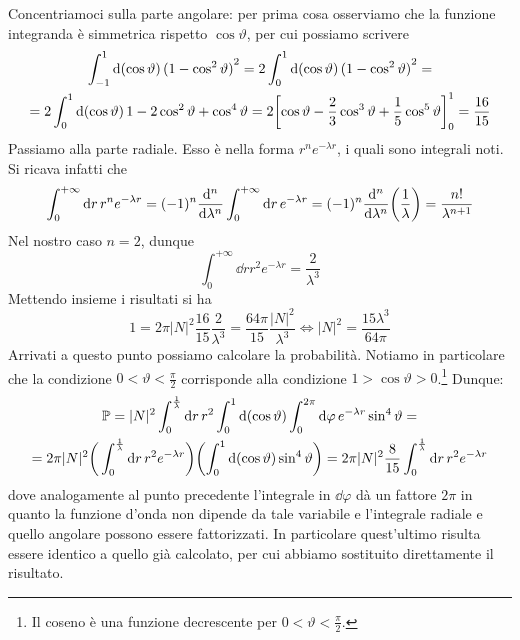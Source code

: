 \begin{soluzione}
   Concentriamoci sulla parte angolare: per prima cosa osserviamo che la funzione integranda è simmetrica rispetto $\cos{\vartheta}$, per cui possiamo scrivere
   \begin{gather*}
      \int_{-1}^{1} \dd{(\cos{\vartheta})} {(1 - \cos^2{\vartheta} )}^2
      =2 \int_{0}^{1} \dd{(\cos{\vartheta})} {(1 - \cos^2{\vartheta} )}^2=
      \\
      =2 \int_{0}^{1} \dd{(\cos{\vartheta})} 1 - 2\cos^2{\vartheta} + \cos^4{\vartheta}
      =2 \qty[ \cos{\vartheta} - \frac{2}{3}\cos^3{\vartheta} + \frac{1}{5}\cos^5{\vartheta} ]_{0}^{1}
      =\frac{16}{15}
   \end{gather*}
   Passiamo alla parte radiale. Esso è nella forma $r^n e^{-\lambda r}$, i quali sono integrali noti. Si ricava infatti che
   \begin{equation*}
      \int_{0}^{+\infty}\dd{r} r^n e^{-\lambda r}
      =(-1)^n \dv[n]{\lambda} \int_{0}^{+\infty}\dd{r} e^{-\lambda r}
      =(-1)^n\dv[n]{\lambda} \qty( \frac{1}{\lambda} )
      =\frac{n!}{\lambda^{n+1}}
   \end{equation*}
   Nel nostro caso $n=2$, dunque
   \begin{equation*}
      \int_{0}^{+\infty}\dd{r} r^2 e^{-\lambda r}
      =\frac{2}{\lambda^{3}}
   \end{equation*}
   Mettendo insieme i risultati si ha
   \begin{equation*}
      1=2\pi |N|^2 \frac{16}{15} \frac{2}{\lambda^{3}}
      =\frac{64 \pi}{15} \frac{|N|^2}{\lambda^3}
      \iff
      |N|^2=\frac{15\lambda^3}{64 \pi}
   \end{equation*}
   Arrivati a questo punto possiamo calcolare la probabilità. Notiamo in particolare che la condizione $0 < \vartheta < \frac{\pi}{2}$ corrisponde alla condizione $1 > \cos{\vartheta} > 0$.\footnote{Il coseno è una funzione decrescente per $0 < \vartheta < \frac{\pi}{2}$.} Dunque:
   \begin{gather*}
      \mathbb{P}
      =|N|^2 \int_{0}^{\frac{1}{\lambda}} \dd{r} r^2 \int_{0}^{1} \dd{(\cos{\vartheta})} \int_{0}^{2\pi} \dd{\varphi} e^{-\lambda r} \sin^4{\vartheta}=
      \\
      =2\pi |N|^2 \bigg( \int_{0}^{\frac{1}{\lambda}} \dd{r} r^2 e^{-\lambda r} \bigg) \qty( \int_{0}^{1} \dd{(\cos{\vartheta})} \sin^4{\vartheta} )
      =2\pi |N|^2 \frac{8}{15} \int_{0}^{\frac{1}{\lambda}} \dd{r} r^2 e^{-\lambda r}
   \end{gather*}
   dove analogamente al punto precedente l'integrale in $\dd{\varphi}$ dà un fattore $2\pi$ in quanto la funzione d'onda non dipende da tale variabile e l'integrale radiale e quello angolare possono essere fattorizzati. In particolare quest'ultimo risulta essere identico a quello già calcolato, per cui abbiamo sostituito direttamente il risultato.\\

\end{soluzione}

